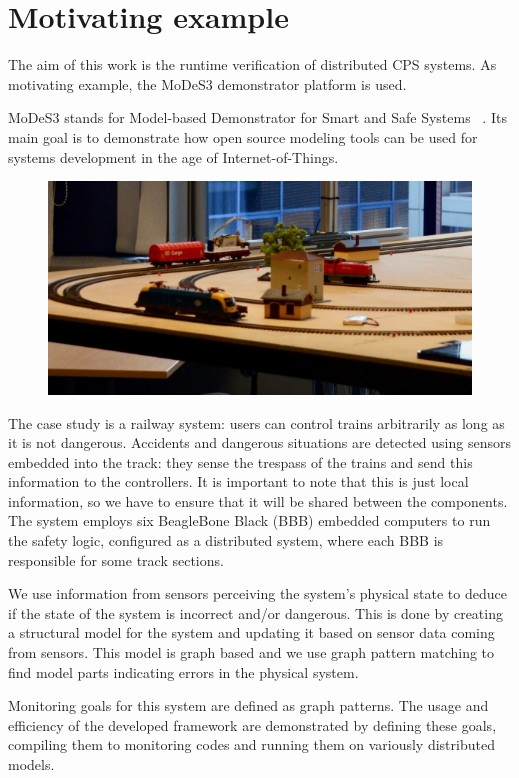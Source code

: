 \chapter{Motivating example}


The aim of this work is the runtime verification of distributed CPS systems. As motivating example, the MoDeS3 demonstrator platform is used. 

 MoDeS3 stands for Model-based Demonstrator for Smart and Safe Systems~\cite{modes3} . Its main goal is to demonstrate how open source modeling tools can be used for systems development in the age of Internet-of-Things.
 

\begin{figure}[H]
	\begin{center}
		\includegraphics[width=\textwidth]{figures/modes.png}
	\end{center}
\end{figure}
 
 The case study is a railway system: users can control trains arbitrarily as long as it is not dangerous. Accidents and dangerous situations are detected using sensors embedded into the track: they sense the trespass of the trains and send this information to the controllers. It is important to note that this is just local information, so we have to ensure that it will be shared between the components. The system employs six BeagleBone Black (BBB) embedded computers to run the safety logic, configured as a distributed system, where each BBB is responsible for some track sections.


\pagebreak
We use information from sensors perceiving the system's physical state to deduce if the state of the system is incorrect and/or dangerous. This is done by creating a structural model for the system and updating it based on sensor data coming from sensors. This model is graph based and we use graph pattern matching to find model parts indicating errors in the physical system.

Monitoring goals for this system are defined as graph patterns. The usage and efficiency of the developed framework are demonstrated by defining these goals, compiling them to monitoring codes and running them on variously distributed models. 



